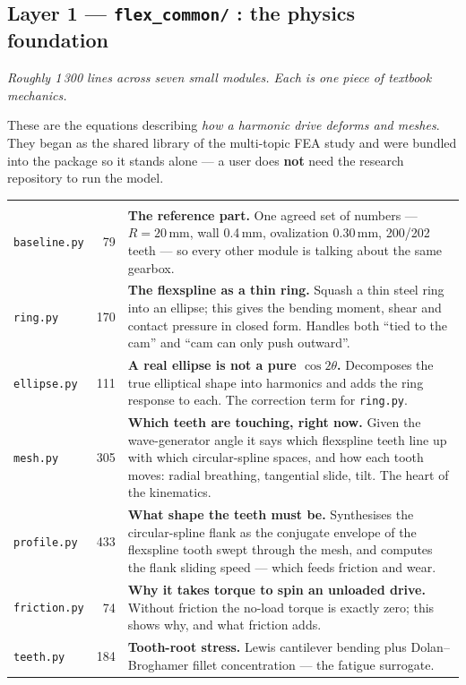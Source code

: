 \documentclass[11pt,a4paper]{article}
\newcommand{\pkg}[1]{\texttt{#1}}
\begin{document}
\subsection{Layer 1 --- \pkg{flex\_common/} : the physics foundation}

\emph{Roughly 1\,300 lines across seven small modules. Each is one piece of
textbook mechanics.}

These are the equations describing \emph{how a harmonic drive deforms and
meshes}. They began as the shared library of the multi-topic FEA study and were
bundled into the package so it stands alone --- a user does \textbf{not} need
the research repository to run the model.

\renewcommand{\arraystretch}{1.25}
\begin{tabularx}{\textwidth}{@{}l r Y@{}}
 &  &  \\
\pkg{baseline.py} & 79 & \textbf{The reference part.} One agreed set of numbers
--- $R=20$\,mm, wall 0.4\,mm, ovalization 0.30\,mm, 200/202 teeth --- so every
other module is talking about the same gearbox. \\
\pkg{ring.py} & 170 & \textbf{The flexspline as a thin ring.} Squash a thin
steel ring into an ellipse; this gives the bending moment, shear and contact
pressure in closed form. Handles both ``tied to the cam'' and ``cam can only
push outward''. \\
\pkg{ellipse.py} & 111 & \textbf{A real ellipse is not a pure $\cos2\theta$.}
Decomposes the true elliptical shape into harmonics and adds the ring response
to each. The correction term for \pkg{ring.py}. \\
\pkg{mesh.py} & 305 & \textbf{Which teeth are touching, right now.} Given the
wave-generator angle it says which flexspline teeth line up with which
circular-spline spaces, and how each tooth moves: radial breathing, tangential
slide, tilt. The heart of the kinematics. \\
\pkg{profile.py} & 433 & \textbf{What shape the teeth must be.} Synthesises the
circular-spline flank as the conjugate envelope of the flexspline tooth swept
through the mesh, and computes the flank sliding speed --- which feeds friction
and wear. \\
\pkg{friction.py} & 74 & \textbf{Why it takes torque to spin an unloaded
drive.} Without friction the no-load torque is exactly zero; this shows why,
and what friction adds. \\
\pkg{teeth.py} & 184 & \textbf{Tooth-root stress.} Lewis cantilever bending
plus Dolan--Broghamer fillet concentration --- the fatigue surrogate. \\
\end{tabularx}
\end{document}
